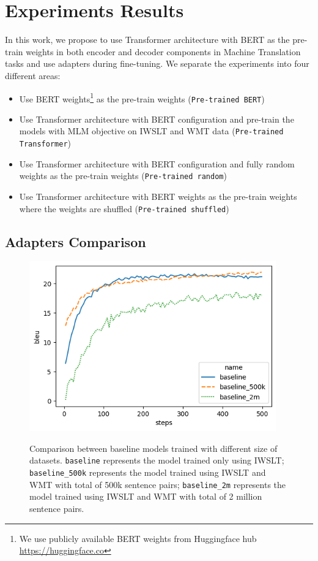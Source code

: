 
\chapter{Experiments Results}
In this work, we propose to use Transformer architecture with BERT as the pre-train weights in both encoder and decoder components in Machine Translation tasks and use adapters during fine-tuning. We separate the experiments into four different areas:
\begin{itemize}
    \item Use BERT weights\footnote{We use publicly available BERT weights from Huggingface hub \url{https://huggingface.co}} as the pre-train weights (\texttt{Pre-trained BERT})
    \item Use Transformer architecture with BERT configuration and pre-train the models with MLM objective on IWSLT and WMT data (\texttt{Pre-trained Transformer})
    \item Use Transformer architecture with BERT configuration and fully random weights as the pre-train weights (\texttt{Pre-trained random})
    \item Use Transformer architecture with BERT weights as the pre-train weights where the weights are shuffled (\texttt{Pre-trained shuffled})
\end{itemize}

\section{Adapters Comparison}
\begin{figure}[h]
    {\includegraphics[width=0.95\textwidth]{img/baseline.png}}
    \centering
    \caption{
        Comparison between baseline models trained with different size of datasets. \texttt{baseline} represents the model trained only using IWSLT; \texttt{baseline\_500k} represents the model trained using IWSLT and WMT with total of 500k sentence pairs; \texttt{baseline\_2m} represents the model trained using IWSLT and WMT with total of 2 million sentence pairs.}
    \label{img:basecomp}
\end{figure}

